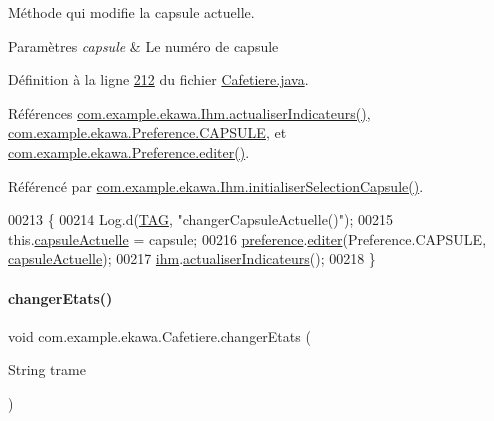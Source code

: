 Méthode qui modifie la capsule actuelle. 


\begin{DoxyParams}{Paramètres}
{\em capsule} & Le numéro de capsule \\
\hline
\end{DoxyParams}


Définition à la ligne \hyperlink{_cafetiere_8java_source_l00212}{212} du fichier \hyperlink{_cafetiere_8java_source}{Cafetiere.\+java}.



Références \hyperlink{_ihm_8java_source_l00855}{com.\+example.\+ekawa.\+Ihm.\+actualiser\+Indicateurs()}, \hyperlink{_preference_8java_source_l00031}{com.\+example.\+ekawa.\+Preference.\+C\+A\+P\+S\+U\+LE}, et \hyperlink{_preference_8java_source_l00100}{com.\+example.\+ekawa.\+Preference.\+editer()}.



Référencé par \hyperlink{_ihm_8java_source_l00413}{com.\+example.\+ekawa.\+Ihm.\+initialiser\+Selection\+Capsule()}.


\begin{DoxyCode}
00213     \{
00214         Log.d(\hyperlink{classcom_1_1example_1_1ekawa_1_1_cafetiere_aa0c1fd99a2508b06c462aea17034aa91}{TAG}, \textcolor{stringliteral}{"changerCapsuleActuelle()"});
00215         this.\hyperlink{classcom_1_1example_1_1ekawa_1_1_cafetiere_ac8fa3d1ad76eccf431ee04b395a557a3}{capsuleActuelle} = capsule;
00216         \hyperlink{classcom_1_1example_1_1ekawa_1_1_cafetiere_aee3f9b78df63bc8dd73bf564954d51ca}{preference}.\hyperlink{classcom_1_1example_1_1ekawa_1_1_preference_a5af7a0595acfd41f1bd0b34ca0bfcb2a}{editer}(Preference.CAPSULE, \hyperlink{classcom_1_1example_1_1ekawa_1_1_cafetiere_ac8fa3d1ad76eccf431ee04b395a557a3}{capsuleActuelle});
00217         \hyperlink{classcom_1_1example_1_1ekawa_1_1_cafetiere_a7db4a63088834eda5f6a3e951611bf82}{ihm}.\hyperlink{classcom_1_1example_1_1ekawa_1_1_ihm_a2c3740dd5be20b3111b36649514fd41e}{actualiserIndicateurs}();
00218     \}
\end{DoxyCode}
\mbox{\label{classcom_1_1example_1_1ekawa_1_1_cafetiere_aba42bba06ffbf08735d7f548bcce9f42}} 
\paragraph{\texorpdfstring{changer\+Etats()}{changerEtats()}}
{\footnotesize\ttfamily void com.\+example.\+ekawa.\+Cafetiere.\+changer\+Etats (\begin{DoxyParamCaption}\item[{String}]{trame }\end{DoxyParamCaption})}



